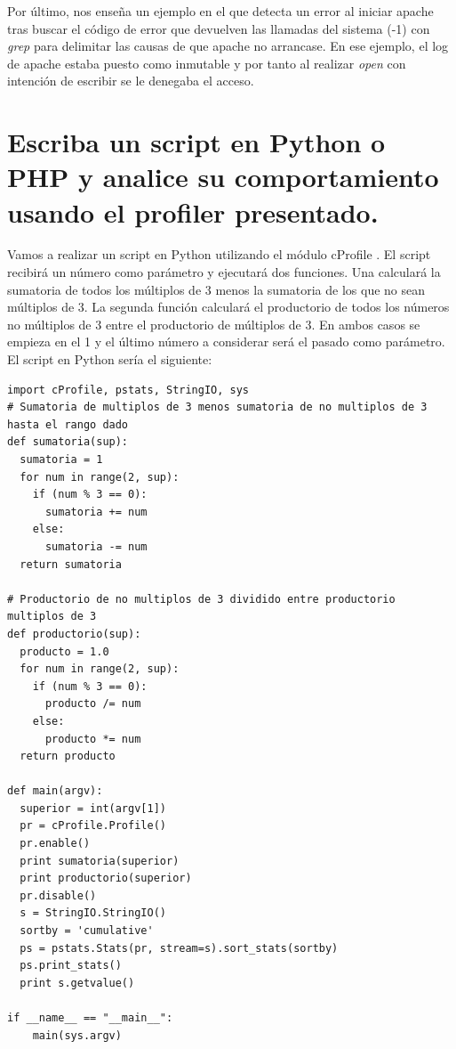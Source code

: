 Por último, nos enseña un ejemplo en el que detecta un error al iniciar apache tras buscar el código de error que devuelven las llamadas del sistema (-1) con \textit{grep} para delimitar las causas de que apache no arrancase. En ese ejemplo, el log de apache estaba puesto como inmutable y por tanto al realizar \textit{open} con intención de escribir se le denegaba el acceso.


\section{Escriba un script en Python o PHP y analice su comportamiento usando el profiler presentado.}

Vamos a realizar un script en Python utilizando el módulo cProfile \cite{c8}. El script recibirá un número como parámetro y ejecutará dos funciones. Una calculará la sumatoria de todos los múltiplos de 3 menos la sumatoria de los que no sean múltiplos de 3. La segunda función calculará el productorio de todos los números no múltiplos de 3 entre el productorio de múltiplos de 3. En ambos casos se empieza en el 1 y el último número a considerar será el pasado como parámetro. El script en Python sería el siguiente:

\begin{verbatim}
import cProfile, pstats, StringIO, sys
# Sumatoria de multiplos de 3 menos sumatoria de no multiplos de 3 hasta el rango dado
def sumatoria(sup):
  sumatoria = 1
  for num in range(2, sup):
    if (num % 3 == 0):
      sumatoria += num
    else:
      sumatoria -= num
  return sumatoria

# Productorio de no multiplos de 3 dividido entre productorio multiplos de 3
def productorio(sup):
  producto = 1.0
  for num in range(2, sup):
    if (num % 3 == 0):
      producto /= num
    else:
      producto *= num
  return producto

def main(argv):
  superior = int(argv[1])
  pr = cProfile.Profile()
  pr.enable()
  print sumatoria(superior)
  print productorio(superior)
  pr.disable()
  s = StringIO.StringIO()
  sortby = 'cumulative'
  ps = pstats.Stats(pr, stream=s).sort_stats(sortby)
  ps.print_stats()
  print s.getvalue()

if __name__ == "__main__":
    main(sys.argv)
\end{verbatim}

